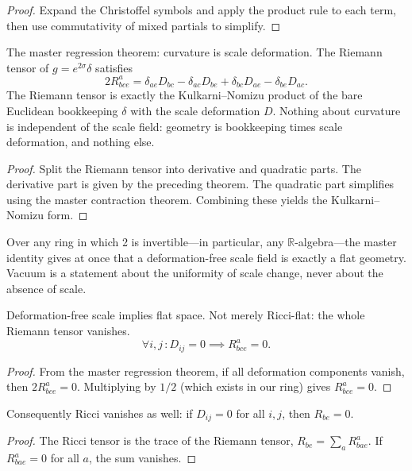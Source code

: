 \begin{proof}
Expand the Christoffel symbols and apply the product rule to each term, then use commutativity of mixed partials to simplify.
\end{proof}

\begin{theorem}
The master regression theorem: curvature is scale deformation. The Riemann tensor of $g = e^{2\sigma}\delta$ satisfies
$$2R^a_{bce} = \delta_{ae}D_{bc} - \delta_{ac}D_{be} + \delta_{bc}D_{ae} - \delta_{be}D_{ac}.$$
The Riemann tensor is exactly the Kulkarni--Nomizu product of the bare Euclidean bookkeeping $\delta$ with the scale deformation $D$. Nothing about curvature is independent of the scale field: geometry is bookkeeping times scale deformation, and nothing else. 
\end{theorem}

\begin{proof}
Split the Riemann tensor into derivative and quadratic parts. The derivative part is given by the preceding theorem. The quadratic part simplifies using the master contraction theorem. Combining these yields the Kulkarni--Nomizu form.
\end{proof}

Over any ring in which 2 is invertible---in particular, any $\mathbb{R}$-algebra---the master identity gives at once that a deformation-free scale field is exactly a flat geometry. Vacuum is a statement about the uniformity of scale change, never about the absence of scale.

\begin{theorem}
Deformation-free scale implies flat space. Not merely Ricci-flat: the whole Riemann tensor vanishes.
$$\forall i,j\,: D_{ij} = 0 \implies R^a_{bce} = 0.$$
\end{theorem}

\begin{proof}
From the master regression theorem, if all deformation components vanish, then $2R^a_{bce} = 0$. Multiplying by $1/2$ (which exists in our ring) gives $R^a_{bce} = 0$.
\end{proof}

\begin{theorem}
Consequently Ricci vanishes as well: if $D_{ij} = 0$ for all $i,j$, then $R_{be} = 0$. 
\end{theorem}

\begin{proof}
The Ricci tensor is the trace of the Riemann tensor, $R_{be} = \sum_a R^a_{bae}$. If $R^a_{bae} = 0$ for all $a$, the sum vanishes.
\end{proof}

